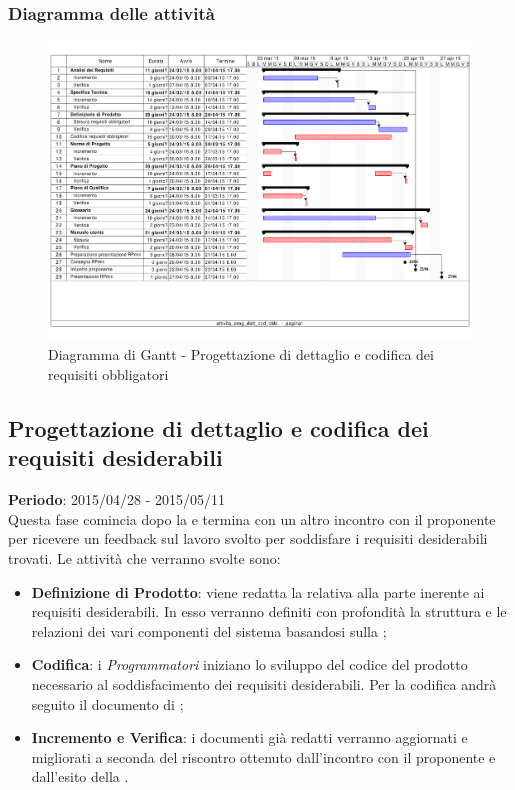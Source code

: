 		\subsubsection{Diagramma delle attività} %
		\label{ssub:diagramma_delle_attivita}
			\begin{figure}[htbp]
				\centering
				\centerline{\includegraphics[scale=0.7]{images/d_attivita_prog_dett_cod_obbl.pdf}}
				\caption{Diagramma di Gantt - Progettazione di dettaglio e codifica dei requisiti obbligatori}
				\label{fig:gantt_prog_dett_cod_requisiti_obbligatori}				
			\end{figure}
	
	\subsection{Progettazione di dettaglio e codifica dei requisiti desiderabili} %
	\label{sub:progettazione_di_dettaglio_e_codifica_dei_requisiti_desiderabili}
	\textbf{Periodo}:  2015/04/28 - 2015/05/11 \\
	Questa fase comincia dopo la \RPmin{} e termina con un altro incontro con il proponente per ricevere un feedback sul lavoro svolto per soddisfare i requisiti desiderabili trovati.
	Le attività che verranno svolte sono:
		\begin{itemize}
			\item \textbf{Definizione di Prodotto}: viene redatta la \docNameVersionDdP{} relativa alla parte inerente ai requisiti desiderabili. In esso verranno definiti con profondità la struttura e le relazioni dei vari componenti del sistema basandosi sulla \docNameVersionST;
			\item \textbf{Codifica}: i \emph{Programmatori} iniziano lo sviluppo del codice del prodotto necessario al soddisfacimento dei requisiti desiderabili. Per la codifica andrà seguito il documento di \docNameVersionDdP;
			\item \textbf{Incremento e Verifica}: i documenti già redatti verranno aggiornati e migliorati a seconda del riscontro ottenuto dall'incontro con il proponente e dall'esito della \RPmin.
		\end{itemize}
		
